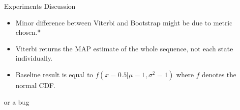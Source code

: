 \documentclass[pdf]
{beamer}
\begin{document}
\begin{frame}{Experiments Discussion}
\begin{itemize}
	\item Minor difference between Viterbi and Bootstrap might be due to metric chosen.*
	\item Viterbi returns the MAP estimate of the whole sequence, not each state individually.
	\item Baseline result is equal to $f(x = 0.5 | \mu = 1, \sigma^2 = 1)$ where $f$ denotes the normal CDF.
\end{itemize}
\tiny * or a bug
\end{frame}



\end{document}
